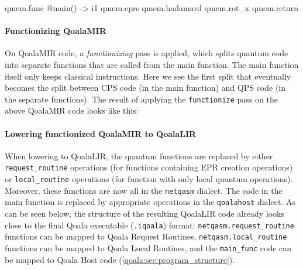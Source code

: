 \begin{pycode}
qmem.func @main() -> i1 {
    qmem.eprs %
    qmem.hadamard %
    qmem.rot_x %
    qmem.return %
}
\end{pycode}

\paragraph{Functionizing QoalaMIR}
On QoalaMIR code, a \emph{functionizing} pass is applied, which splits quantum code into separate functions that are called from the main function.
The main function itself only keeps classical instructions.
Here we see the first split that eventually becomes the split between CPS code (in the main function) and QPS code (in the separate functions).
The result of applying the \texttt{functionize} pass on the above QoalaMIR code looks like this:


\paragraph{Lowering functionized QoalaMIR to QoalaLIR}
When lowering to QoalaLIR, the quantum functions are replaced by either \texttt{request\_routine} operations (for functions containing EPR creation operations) or \texttt{local\_routine} operations (for function with only local quantum operations).
Moreover, these functions are now all in the \texttt{netqasm} dialect.
The code in the main function is replaced by appropriate operations in the \texttt{qoalahost} dialect.
As can be seen below, the structure of the resulting QoalaLIR code already looks close to the final Qoala executable (\texttt{.iqoala}) format: \texttt{netqasm.request\_routine} functions can be mapped to Qoala Request Routines, \texttt{netqasm.local\_routine} functions can be mapped to Qoala Local Routines, and the \texttt{main\_func} code can be mapped to Qoala Host code (\cref{qoala:sec:program_structure}).

